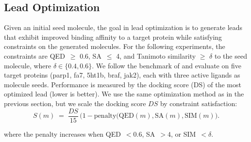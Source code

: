 \documentclass{article} %
\begin{document}
\subsection{Lead Optimization}
Given an initial seed molecule, the goal in lead optimization is to generate leads that exhibit improved binding affinity to a target protein while satisfying constraints on the generated molecules. For the following experiments, the constraints are QED~$\geq$ 0.6, SA~$\leq$ 4, and Tanimoto similarity $\geq$ $\delta$ to the seed molecule, where $\delta\in \{0.4, 0.6\}$. We follow the benchmark of \cite{genmol} and evaluate on five target proteins (parp1, fa7, 5ht1b, braf, jak2), each with three active ligands as molecule seeds. Performance is measured by the docking score (DS) of the most optimized lead (lower is better).
 We use the same optimization method as in the previous section, but we scale the docking score $DS$ by constraint satisfaction:
\begin{equation}
S(m) \;=\; \frac{DS}{15}\,\bigl(1-\text{penalty}(\text{QED}(m),\text{SA}(m),\text{SIM}(m)\bigr).
\end{equation}

where the penalty increases when QED~$<0.6$, SA~$>4$, or SIM~$<\delta$.
\end{document}
